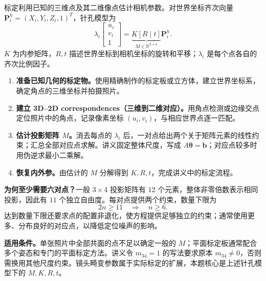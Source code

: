 \begin{checkedsolution}
标定利用已知的三维点及其二维像点估计相机参数。对世界坐标齐次向量 $\bm P_i^h=(X_i,Y_i,Z_i,1)^T$，针孔模型为
\[
  \lambda_i\begin{bmatrix}u_i\\v_i\\1\end{bmatrix}
    =\underbrace{K[R\mid t]}_{M\in\mathbb R^{3\times4}}\bm P_i^h.
\]
$K$ 为内参矩阵，$R,t$ 描述世界坐标到相机坐标的旋转和平移；$\lambda_i$ 是每个点各自的齐次比例因子。

\begin{enumerate}[label=\arabic*.]
  \item \textbf{准备已知几何的标定物。}使用精确制作的标定板或立方体，建立世界坐标系，确定角点的三维坐标并拍摄照片。
  \item \textbf{建立 3D--2D correspondences（三维到二维对应）。}用角点检测或边缘交点定位照片中的角点，记录像素坐标 $(u_i,v_i)$，与相应世界点逐一匹配。
  \item \textbf{估计投影矩阵 $M$。}消去每点的 $\lambda_i$ 后，一对点给出两个关于矩阵元素的线性约束；汇总全部对应点求解。讲义固定整体尺度，写成 $A\bm\theta=\bm b$；对应点较多时用伪逆求最小二乘解。
  \item \textbf{恢复内外参。}由估计的 $M$ 分解得到 $K,R,t$，完成讲义中的标定流程。
\end{enumerate}

\textbf{为何至少需要六对点？}一般 $3\times4$ 投影矩阵有 $12$ 个元素，整体非零倍数表示相同投影，因此有 $11$ 个独立自由度。每对点提供两个约束，数量下限为
\[
  2n\ge11\quad\Longrightarrow\quad\boxed{n\ge6}.
\]
达到数量下限还要求点的配置非退化，使方程提供足够独立的约束；通常使用更多、分布良好的对应点，以降低定位噪声的影响。

\textbf{适用条件。}单张照片中全部共面的点不足以确定一般的 $M$；平面标定板通常配合多个姿态和专门的平面标定方法。讲义令 $m_{34}=1$ 的写法要求原本 $m_{34}\ne0$，否则需换用其他尺度约束。镜头畸变参数属于实际标定的扩展，本题核心是上述针孔模型下的 $M,K,R,t$。
\end{checkedsolution}
\endgroup
